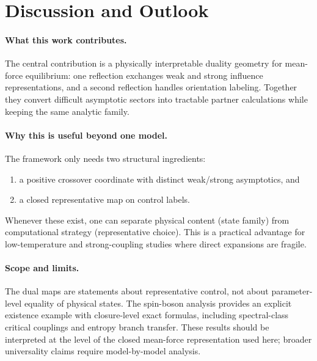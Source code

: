\section{Discussion and Outlook}
\label{sec:discussion_outlook}

\paragraph{What this work contributes.}
The central contribution is a physically interpretable duality geometry for mean-force equilibrium:
one reflection exchanges weak and strong influence representations, and a second reflection handles
orientation labeling.
Together they convert difficult asymptotic sectors into tractable partner calculations while keeping
the same analytic family.

\paragraph{Why this is useful beyond one model.}
The framework only needs two structural ingredients:
\begin{enumerate}
  \item a positive crossover coordinate with distinct weak/strong asymptotics, and
  \item a closed representative map on control labels.
\end{enumerate}
Whenever these exist, one can separate physical content (state family) from computational strategy
(representative choice).
This is a practical advantage for low-temperature and strong-coupling studies where direct expansions
are fragile.

\paragraph{Scope and limits.}
The dual maps are statements about representative control, not about parameter-level equality of
physical states.
The spin-boson analysis provides an explicit existence example with closure-level exact formulas,
including spectral-class critical couplings and entropy branch transfer.
These results should be interpreted at the level of the closed mean-force representation used here;
broader universality claims require model-by-model analysis.

